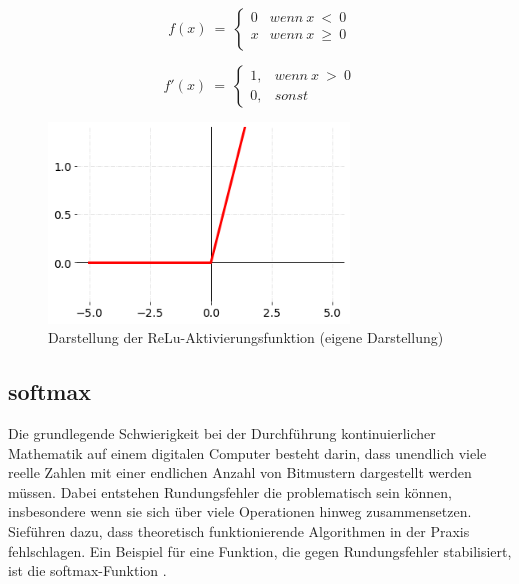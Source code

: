 \begin{equation} \label{Relu}
    f( x) \ =\ \begin{cases}
        0 & wenn\ x\  <\ 0    \\
        x & wenn\ x\  \geq\ 0 \\
    \end{cases}
\end{equation}

\begin{equation} \label{ReluAbl}
    f'( x) \ =\ \begin{cases}
        1, & wenn\ x\  >\ 0 \\
        0, & sonst
    \end{cases}
\end{equation}

\begin{figure}[H]
    \centering
    \includegraphics[width=8cm]{kapitel2/relu_plot.png}
    \caption[Darstellung der ReLu-Aktivierungsfunktion]{Darstellung der ReLu-Aktivierungsfunktion (eigene Darstellung)}
    \label{Kap2:ReLu_plot}
\end{figure}

\subsection{softmax}
Die grundlegende Schwierigkeit bei der Durchführung kontinuierlicher Mathematik auf einem digitalen Computer besteht darin, dass unendlich viele reelle Zahlen mit einer endlichen Anzahl von Bitmustern dargestellt werden müssen. Dabei entstehen Rundungsfehler die problematisch sein können, insbesondere wenn sie sich über viele Operationen hinweg zusammensetzen. Sieführen dazu, dass theoretisch funktionierende Algorithmen in der Praxis fehlschlagen. Ein Beispiel für eine Funktion, die gegen Rundungsfehler stabilisiert, ist die softmax-Funktion \cite*[80-81]{IanGoodfellowYoshuaBengio2016}.

